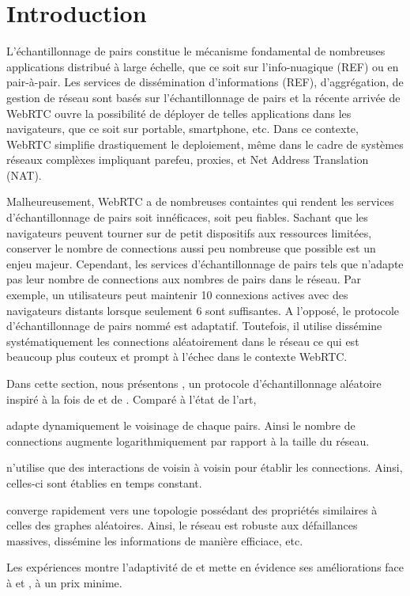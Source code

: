 
\section{Introduction}

L'échantillonnage de pairs constitue le mécanisme fondamental de nombreuses
applications distribué à large échelle, que ce soit sur l'info-nuagique (REF) ou
en pair-à-pair. Les services de dissémination d'informations (REF),
d'aggrégation, de gestion de réseau sont basés sur l'échantillonnage de pairs et
la récente arrivée de WebRTC ouvre la possibilité de déployer de telles
applications dans les navigateurs, que ce soit sur portable, smartphone, etc. 
Dans ce contexte, WebRTC simplifie drastiquement le deploiement, même dans le
cadre de systèmes réseaux complèxes impliquant parefeu, proxies, et Net Address
Translation (NAT).

Malheureusement, WebRTC a de nombreuses containtes qui rendent les services
d'échantillonnage de pairs soit innéficaces, soit peu fiables. Sachant que les
navigateurs peuvent tourner sur de petit dispositifs aux ressources limitées,
conserver le nombre de connections aussi peu nombreuse que possible est un enjeu
majeur. Cependant, les services d'échantillonnage de pairs tels que \CYCLON
n'adapte pas leur nombre de connections aux nombres de pairs dans le réseau. Par
exemple, un utilisateurs peut maintenir 10 connexions actives avec des
navigateurs distants lorsque seulement 6 sont suffisantes. A l'opposé, le
protocole d'échantillonnage de pairs nommé \SCAMP est adaptatif. Toutefois, il
utilise dissémine systématiquement les connections aléatoirement dans le réseau
ce qui est beaucoup plus couteux et prompt à l'échec dans le contexte WebRTC.

Dans cette section, nous présentons \SPRAY, un protocole d'échantillonnage
aléatoire inspiré à la fois de \SCAMP et de \CYCLON. Comparé à l'état de l'art,
\begin{inparaenum}
\item \SPRAY adapte dynamiquement le voisinage de chaque pairs. Ainsi le nombre
  de connections augmente logarithmiquement par rapport à la taille du réseau.
\item \SPRAY n'utilise que des interactions de voisin à voisin pour établir les
  connections. Ainsi, celles-ci sont établies en temps constant.
\item \SPRAY converge rapidement vers une topologie possédant des propriétés
  similaires à celles des graphes aléatoires. Ainsi, le réseau est robuste aux
  défaillances massives, dissémine les informations de manière efficiace, etc.
\end{inparaenum}
Les expériences montre l'adaptivité de \SPRAY et mette en évidence ses
améliorations face à \CYCLON et \SCAMP, à un prix minime.
  



